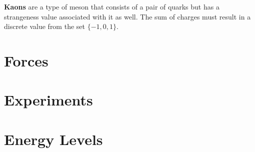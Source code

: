 \documentclass{article}
\begin{document}
\textbf{Kaons} are a type of meson that consists of a pair of quarks but has a strangeness value associated with it as well. The sum of charges must result in a discrete value from the set $\{-1, 0, 1\}$. 

\section{Forces}

\section{Experiments} %

\section{Energy Levels} %
\end{document}
